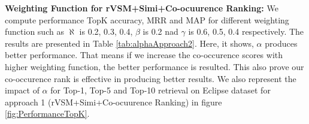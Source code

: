 \documentclass[conference]{IEEEtran}
\begin{document}
\textbf{Weighting Function for rVSM+Simi+Co-ocuurence Ranking:}
We compute performance TopK accuracy, MRR and MAP for different weighting function such as  $\aleph$ is 0.2, 0.3, 0.4, $\beta$ is 0.2 nad $\gamma$ is 0.6, 0.5, 0.4 respectively. The results are presented in Table \ref{tab:alphaApproach2}. 
 Here, it shows, $\alpha$ produces better performance. That means if we increase the co-occurence scores with higher weighting function, the better performance is resulted. This also prove our co-occurence rank is effective in producing better results. We also represent the impact of $\alpha$ for Top-1, Top-5 and Top-10 retrieval on Eclipse dataset for approach 1 (rVSM+Simi+Co-ocuurence Ranking) in figure \ref{fig:PerformanceTopK}.
\begin{table}[htbp]
\centering
\caption{Performance of (rVSM+Simi+Co-Occerence) for different weighting factors}
\label{tab:alphaApproach1}
\end{table}
\end{document}

